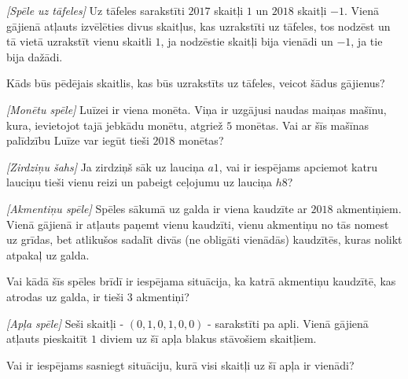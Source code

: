 






\noindent 



\begin{problem}
\textit{[Spēle uz tāfeles]}
Uz tāfeles sarakstīti $2017$ skaitļi $1$ un $2018$ skaitļi $-1$. Vienā gājienā atļauts izvēlēties divus skaitļus, kas uzrakstīti uz tāfeles, tos nodzēst un tā vietā uzrakstīt vienu skaitli $1$, ja nodzēstie skaitļi bija vienādi un $-1$, ja tie bija dažādi.

Kāds būs pēdējais skaitlis, kas būs uzrakstīts uz tāfeles, veicot šādus gājienus?

\end{problem}
%

\begin{problem}
\textit{[Monētu spēle]}
Luīzei ir viena monēta. Viņa ir uzgājusi naudas maiņas mašīnu, kura, ievietojot tajā jebkādu monētu, atgriež $5$ monētas.
Vai ar šīs mašīnas palīdzību Luīze var iegūt tieši $2018$ monētas?
\end{problem}
%

\begin{problem}
\textit{[Zirdziņu šahs]}
Ja zirdziņš sāk uz lauciņa $a1$, vai ir iespējams apciemot katru lauciņu tieši vienu reizi un pabeigt ceļojumu uz lauciņa $h8$?
\end{problem}
%

\begin{problem}
\textit{[Akmentiņu spēle]}
Spēles sākumā uz galda ir viena kaudzīte ar $2018$ akmentiņiem. Vienā gājienā ir atļauts paņemt vienu kaudzīti, vienu akmentiņu no tās nomest uz grīdas, bet atlikušos sadalīt divās (ne obligāti vienādās) kaudzītēs, kuras nolikt atpakaļ uz galda. 

Vai kādā šīs spēles brīdī ir iespējama situācija, ka katrā akmentiņu kaudzītē, kas atrodas uz galda, ir tieši $3$ akmentiņi?
\end{problem}
%

\begin{problem}
\textit{[Apļa spēle]}
Seši skaitļi - $(0,1,0,1,0,0)$ - sarakstīti pa apli. Vienā gājienā atļauts pieskaitīt $1$ diviem uz šī apļa blakus stāvošiem skaitļiem.

Vai ir iespējams sasniegt situāciju, kurā visi skaitļi uz šī apļa ir vienādi?
\end{problem}
%

